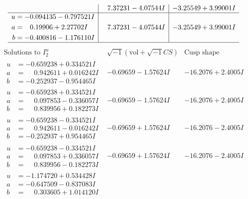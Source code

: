 \documentclass[1p]{elsarticle_modified}
\theoremstyle{definition}
\newcommand{\I}{\sqrt{-1}}
\begin{document}
$$\begin{array}{c|c|c}
 & \phantom{-}7.37231 - 4.07544 I & -3.25549 + 3.99001 I \\ \hline\begin{aligned}
u &= -0.094135 - 0.797521 I \\
a &= \phantom{-}0.19906 + 2.27702 I \\
b &= -0.400816 - 1.176110 I\end{aligned}
 & \phantom{-}7.37231 - 4.07544 I & -3.25549 + 3.99001 I\\
 \hline 
 \end{array}$$\newpage$$\begin{array}{c|c|c}  
\text{Solutions to }I^u_{2}& \I (\text{vol} + \sqrt{-1}CS) & \text{Cusp shape}\\
 \hline 
\begin{aligned}
u &= -0.659238 + 0.334521 I \\
a &= \phantom{-}0.942611 + 0.016242 I \\
b &= -0.252937 - 0.954465 I\end{aligned}
 & -0.69659 - 1.57624 I & -16.2076 + 2.4005 I \\ \hline\begin{aligned}
u &= -0.659238 + 0.334521 I \\
a &= \phantom{-}0.097853 - 0.336057 I \\
b &= \phantom{-}0.839956 + 0.182273 I\end{aligned}
 & -0.69659 - 1.57624 I & -16.2076 + 2.4005 I \\ \hline\begin{aligned}
u &= -0.659238 - 0.334521 I \\
a &= \phantom{-}0.942611 - 0.016242 I \\
b &= -0.252937 + 0.954465 I\end{aligned}
 & -0.69659 + 1.57624 I & -16.2076 - 2.4005 I \\ \hline\begin{aligned}
u &= -0.659238 - 0.334521 I \\
a &= \phantom{-}0.097853 + 0.336057 I \\
b &= \phantom{-}0.839956 - 0.182273 I\end{aligned}
 & -0.69659 + 1.57624 I & -16.2076 - 2.4005 I \\ \hline\begin{aligned}
u &= -1.174720 + 0.534428 I \\
a &= -0.647509 - 0.837083 I \\
b &= \phantom{-}0.303605 + 1.014120 I\end{aligned}

\end{array}$$
\end{document}
